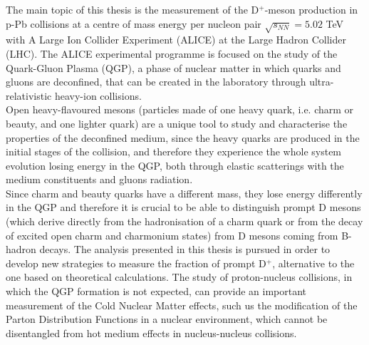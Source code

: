 \documentclass[b5paper,10pt,twoside,oldstyle,classica]{toptesi}
\begin{document}
\abstract
The main topic of this thesis is the measurement of the D$^+$-meson production in p-Pb collisions at a centre of mass energy per nucleon pair $\sqrt{s_{NN}} = 5.02$ TeV with A Large Ion Collider Experiment (ALICE) at the Large Hadron Collider (LHC). 
The ALICE experimental programme is focused on the study of the Quark-Gluon Plasma (QGP), a phase of nuclear matter in which quarks and gluons are deconfined, that can be created in the laboratory through ultra-relativistic heavy-ion collisions. \\
Open heavy-flavoured mesons (particles made of one heavy quark, i.e. charm or beauty, and one lighter quark) are a unique tool to study and characterise the properties of the deconfined medium, since the heavy quarks are produced in the initial stages of the collision, and therefore they experience the whole system evolution losing energy in the QGP, both through elastic scatterings with the medium constituents and gluons radiation.\\
Since charm and beauty quarks have a different mass, they lose energy differently in the QGP and therefore it is crucial to be able to distinguish prompt D mesons (which derive directly from the hadronisation of a charm quark or from the decay of excited open charm and charmonium states) from D mesons coming from B-hadron decays. The analysis presented in this thesis is pursued in order to develop new strategies to measure the fraction of prompt D$^+$, alternative to the one based on theoretical calculations. 
The study of proton-nucleus collisions, in which the QGP formation is not expected, can provide an important measurement of the Cold Nuclear Matter effects, such us the modification of the Parton Distribution Functions in a nuclear environment, which cannot be disentangled from hot medium effects in nucleus-nucleus collisions.\\\\
\end{document}
